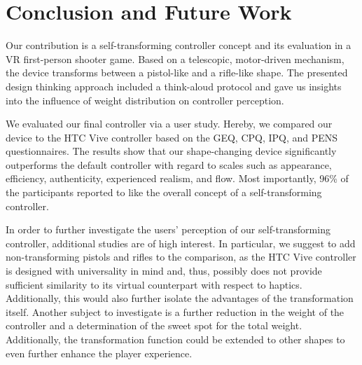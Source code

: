 \documentclass{sigchi}
\begin{document}


\section{Conclusion and Future Work}

Our contribution is a self-transforming controller concept and its evaluation in a VR first-person shooter game. Based on a telescopic, motor-driven mechanism, the device transforms between a pistol-like and a rifle-like shape. The presented design thinking approach included a think-aloud protocol and gave us insights into the influence of weight distribution on controller perception. 

We evaluated our final controller via a user study. Hereby, we compared our device to the HTC Vive controller based on the GEQ, CPQ, IPQ, and PENS questionnaires. The results show that our shape-changing device significantly outperforms the default controller with regard to scales such as appearance, efficiency, authenticity, experienced realism, and flow. Most importantly, 96\% of the participants reported to like the overall concept of a self-transforming controller.

In order to further investigate the users' perception of our self-transforming controller, additional studies are of high interest. In particular, we suggest to add non-transforming pistols and rifles to the comparison, as the HTC Vive controller is designed with universality in mind and, thus, possibly does not provide sufficient similarity to its virtual counterpart with respect to haptics. Additionally, this would also further isolate the advantages of the transformation itself. Another subject to investigate is a further reduction in the weight of the controller and a determination of the sweet spot for the total weight. Additionally, the transformation function could be extended to other shapes to even further enhance the player experience.
\end{document}
